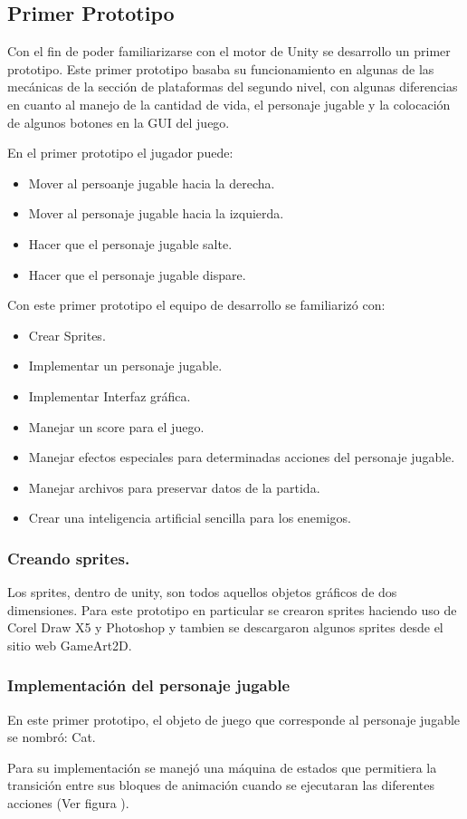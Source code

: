 \subsection{Primer Prototipo}
Con el fin de poder familiarizarse con el motor de Unity
se desarrollo un primer prototipo. Este primer prototipo basaba su funcionamiento 
en algunas de las mecánicas de la sección de plataformas del segundo nivel, con 
algunas diferencias en cuanto al manejo de la cantidad de vida, el personaje 
jugable y la colocación de algunos botones en la GUI del juego.
\\
\par
En el primer prototipo el jugador puede:
\begin{itemize}
	\item Mover al persoanje jugable hacia la derecha.
	\item Mover al personaje jugable hacia la izquierda.
	\item Hacer que el personaje jugable salte.
	\item Hacer que el personaje jugable dispare.
\end{itemize}

Con este primer prototipo el equipo de desarrollo se familiarizó con:
\begin{itemize}
	\item Crear Sprites.
	\item Implementar un personaje jugable.
	\item Implementar Interfaz gráfica.
	\item Manejar un score para el juego.
	\item Manejar efectos especiales para determinadas acciones del personaje jugable.
	\item Manejar archivos para preservar datos de la partida.
	\item Crear una inteligencia artificial sencilla para los enemigos.
\end{itemize}

\subsubsection{Creando sprites.}
Los sprites, dentro de unity, son todos aquellos objetos gráficos de dos 
dimensiones. Para este prototipo en particular se crearon sprites haciendo uso 
de Corel Draw X5 y Photoshop y tambien se descargaron algunos sprites desde 
el sitio web GameArt2D.  %

\subsubsection{Implementación del personaje jugable}
En este primer prototipo, el objeto de juego que corresponde al personaje 
jugable se nombró: Cat. 
\\
\par
Para su implementación se manejó una máquina de estados que permitiera la transición 
entre sus bloques de animación cuando se ejecutaran las diferentes acciones
(Ver figura ). %

